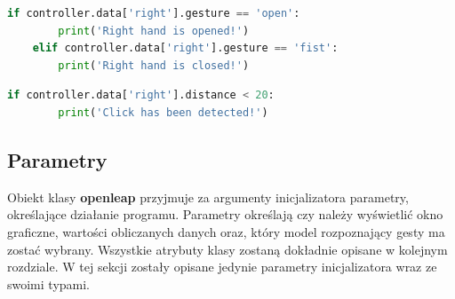 \begin{lstlisting}[language=python, style=programming, caption={Odczyt gestów}, label={lst:get_data1}]
    if controller.data['right'].gesture == 'open':
        print('Right hand is opened!')
    elif controller.data['right'].gesture == 'fist':
        print('Right hand is closed!')
\end{lstlisting}

\begin{lstlisting}[language=python, style=programming, caption={Odczyt edległości między palcami}]
    if controller.data['right'].distance < 20:
        print('Click has been detected!')
\end{lstlisting}

\subsection{Parametry}
\label{parametry}

\quad Obiekt klasy \textbf{openleap} przyjmuje za argumenty inicjalizatora parametry, określające działanie programu. Parametry określają czy należy wyświetlić okno graficzne, wartości obliczanych danych oraz, który model rozpoznający gesty ma zostać wybrany. Wszystkie atrybuty klasy zostaną dokładnie opisane w kolejnym rozdziale. W tej sekcji zostały opisane jedynie parametry inicjalizatora wraz ze swoimi typami.\newline

